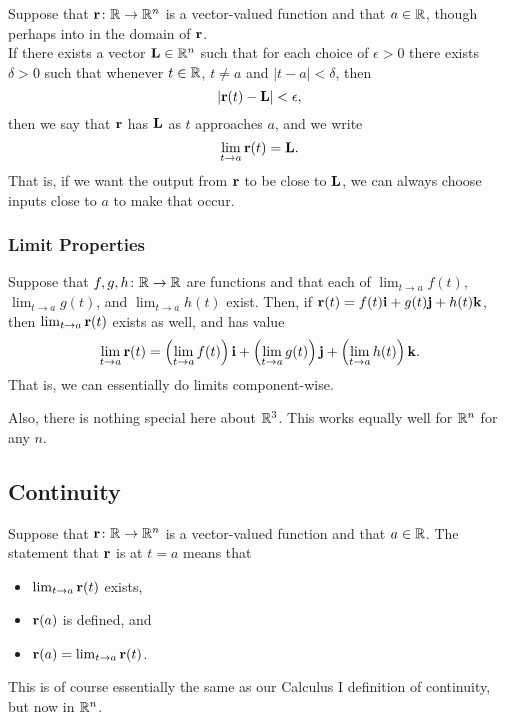 Suppose that \(\mathbf{r} \colon \mathbb{R} \to \mathbb{R}^{n}\) is a vector-valued function and that \(a \in \mathbb{R}\), though perhaps into in the domain of \(\mathbf{r}\). \\

If there exists a vector \(\mathbf{L} \in \mathbb{R}^{n}\) such that for each choice of \(\epsilon > 0\) there exists \(\delta >0\) such that whenever \(t \in \mathbb{R}\), \(t \ne a\) and \(|t - a| < \delta\), then 
\[
    |\mathbf{r}(t) - \mathbf{L}| < \epsilon,
\]
then we say that \(\mathbf{r}\) has  \(\mathbf{L}\) as \(t\) approaches \(a\), and we write
\[
    \lim_{t \to a} \mathbf{r}(t) = \mathbf{L}.
\]
That is, if we want the output from \(\mathbf{r}\) to be close to \(\mathbf{L}\), we can always choose inputs close to \(a\) to make that occur.

\subsubsection{Limit Properties}

Suppose that \(f,g,h \colon \mathbb{R} \to \mathbb{R}\) are functions and that each of \(\lim_{t \to a} f(t)\), \(\lim_{t \to a} g(t)\), and \(\lim_{t \to a} h(t)\) exist. Then, if \(\mathbf{r}(t) = f(t)\mathbf{i} + g(t)\mathbf{j} + h(t)\mathbf{k}\), then \(\lim_{t \to a} \mathbf{r}(t)\) exists as well, and has value 
\[
    \lim_{t \to a} \mathbf{r}(t) = \left(\lim_{t \to a} f(t)\right)\mathbf{i} + \left(\lim_{t \to a} g(t)\right)\mathbf{j} + \left(\lim_{t \to a} h(t)\right)\mathbf{k}.
\]
That is, we can essentially do limits component-wise.

Also, there is nothing special here about \(\mathbb{R}^{3}\). This works equally well for \(\mathbb{R}^{n}\) for any \(n\).

\subsection{Continuity}

Suppose that \(\mathbf{r} \colon \mathbb{R} \to \mathbb{R}^{n}\) is a vector-valued function and that \(a \in \mathbb{R}\). The statement that \(\mathbf{r}\) is  at \(t = a\) means that
\begin{itemize}
    \item \(\lim_{t \to a} \mathbf{r}(t)\) exists,
    \item \(\mathbf{r}(a)\) is defined, and
    \item \(\mathbf{r}(a) = \lim_{t \to a} \mathbf{r}(t)\).
\end{itemize}

This is of course essentially the same as our Calculus I definition of continuity, but now in \(\mathbb{R}^{n}\). \\

